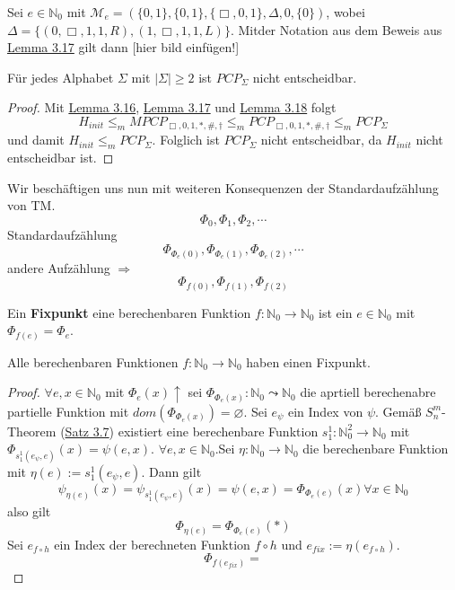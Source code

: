    Sei $e \in \mathbb{N}_0$ mit $\mathcal{M}_e = (\{0, 1\}, \{0, 1\}, \{\Box, 0, 1\}, \Delta, 0, \{0\})$, wobei $\Delta = \{(0, \Box, 1, 1, R), (1, \Box, 1, 1, L)\}$. Mitder Notation aus dem Beweis aus \hyperref[subsec:3.16]{Lemma 3.17} gilt dann [hier bild einfügen!]

   Für jedes Alphabet $\Sigma$ mit $|\Sigma| \geq 2$ ist $PCP_{\Sigma}$ nicht entscheidbar. 
  \begin{proof}
    Mit \hyperref[subsec:3.16]{Lemma 3.16}, \hyperref[subsec:3.17]{Lemma 3.17} und \hyperref[subsec:3.18]{Lemma 3.18} folgt \[H_{init} \leq_m MPCP_{\Box, 0, 1, *, \#, \dagger} \leq_m PCP_{\Box, 0, 1, *, \#, \dagger} \leq_m PCP_{\Sigma}\] und damit $H_{init} \leq_m PCP_{\Sigma}$. Folglich ist $PCP_{\Sigma}$ nicht entscheidbar, da $H_{init}$ nicht entscheidbar ist.
  \end{proof}



  
  Wir beschäftigen uns nun mit weiteren Konsequenzen der Standardaufzählung von TM. \[ \Phi_0, \Phi_1, \Phi_2, \cdots \] Standardaufzählung \[\Phi_{\Phi_e(0)}, \Phi_{\Phi_e(1)}, \Phi_{\Phi_e(2)}, \cdots\] andere Aufzählung $\Rightarrow$ \[\Phi_{f(0)}, \Phi_{f(1)}, \Phi_{f(2)}\]

   Ein \textbf{Fixpunkt} eine berechenbaren Funktion $f: \mathbb{N}_0 \to \mathbb{N}_0$ ist ein $e \in \mathbb{N}_0$ mit $\Phi_{f(e)} = \Phi_e$.

   Alle berechenbaren Funktionen $f : \mathbb{N}_0 \to \mathbb{N}_0$ haben einen Fixpunkt.
  \begin{proof}
    $\forall e, x \in \mathbb{N}_0$ mit $\Phi_e(x) \uparrow$ sei $\Phi_{\Phi_e(x)} : \mathbb{N}_0 \leadsto \mathbb{N}_0$ die aprtiell berechenabre partielle Funktion mit $dom(\Phi_{\Phi_e(x)}) = \varnothing$. Sei $e_{\psi}$ ein Index von $\psi$. Gemäß $S_n^m$-Theorem (\hyperref[subsec:3.16]{Satz 3.7}) existiert eine berechenbare Funktion $s_1^1 : \mathbb{N}_0^2 \to \mathbb{N}_0$ mit $\Phi_{s_1^1(e_{\psi}, e)}(x) = \psi(e, x)$. $\forall e, x \in \mathbb{N}_0$.Sei $\eta : \mathbb{N}_0 \to \mathbb{N}_0$ die berechenbare Funktion mit $\eta (e) := s_1^1(e_{\psi}, e)$. Dann gilt \[\psi_{\eta(e)}(x) = \psi_{s_1^1(e_{\psi}, e)}(x) = \psi(e, x) = \Phi_{\Phi_e(e)}(x) \forall x \in \mathbb{N}_0\] also gilt \[\Phi_{\eta(e)} = \Phi_{\Phi_e (e)} (*)\] Sei $e_{f \circ h}$ ein Index der berechneten Funktion $f \circ h$ und $e_{fix} := \eta(e_{f\circ h})$. \[ \Phi_{f(e_{fix})} =\]
  \end{proof}
